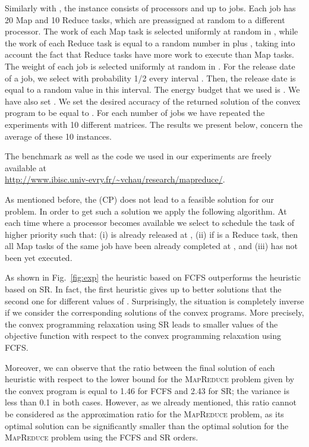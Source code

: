 \documentclass{llncs}
\newcommand{\mr}{\textsc{MapReduce}\xspace}
\newcommand{\mrs}{\textsc{MapReduce}\xspace}
\newcommand{\fcfs}{\textsc{FCFS}\xspace}
\newcommand{\sr}{\textsc{SR}\xspace}
\begin{document}
Similarly with \cite{ChenKL12}, the instance consists of  processors and up to  jobs.
Each job has 20 Map and 10 Reduce tasks, which are preassigned at random to a different processor.
The work of each Map task is selected uniformly at random in ,
while the work of each Reduce task  is equal to a random number in  plus
,
taking into account the fact that Reduce tasks have more work to execute than Map tasks.
The weight of each job is selected uniformly at random in .
For the release date of a job, we select with probability 1/2 every interval .
Then, the release date is equal to a random value in this interval.
The energy budget that we used is .
We have also set .
We set the desired accuracy of the returned solution of the convex program to be equal to .
For each number of jobs we have repeated the experiments with 10 different matrices.
The results we present below, concern the average of these 10 instances.

The benchmark as well as the code we used in our experiments are freely available at\\
\url{http://www.ibisc.univ-evry.fr/~vchau/research/mapreduce/}.


As mentioned before, the (CP) does not lead to a feasible solution for our problem.
In order to get such a solution we apply the following algorithm.
At each time  where a processor becomes available we select to schedule the task  of higher priority such that:
(i)  is already released at ,
(ii) if  is a Reduce task, then all Map tasks of the same job have been already completed at , and
(iii)  has not been yet executed.

As shown in Fig.~\ref{fig:exp} the heuristic based on \fcfs outperforms the heuristic based on \sr.
In fact, the first heuristic gives up to  better solutions that the second one for different values of .
Surprisingly, the situation is completely inverse if we consider the corresponding solutions of the convex programs.
More precisely, the convex programming relaxation using \sr leads to  smaller values of the objective function
with respect to the convex programming relaxation using \fcfs.

Moreover, we can observe that the ratio between the final solution of each heuristic with respect to the lower bound for the \mrs problem
given by the convex program is equal to 1.46 for \fcfs and 2.43 for \sr;
the variance is less than 0.1 in both cases.
However, as we already mentioned, this ratio cannot be considered as the approximation ratio for the \mr problem,
as its optimal solution can be significantly smaller than the optimal solution for the \mrs problem using the \fcfs and \sr orders.
\end{document}
